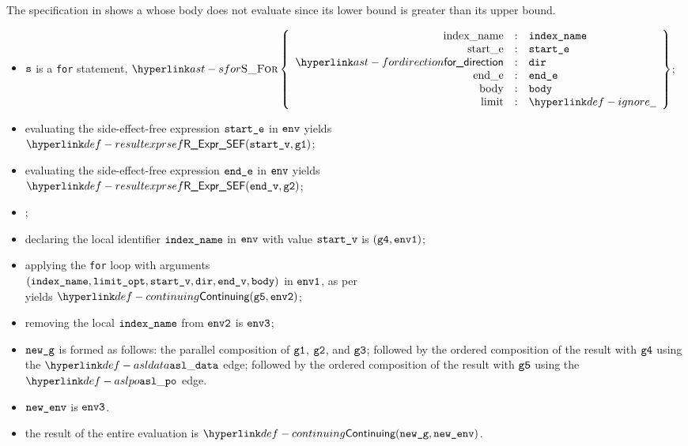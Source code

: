 The specification in  shows a \forstatementterm{}
whose body does not evaluate since its lower bound is greater than its upper bound.

\ProseParagraph
\AllApply
\begin{itemize}
  \item $\texttt{s}$ is a \texttt{for} statement, $\SFor\left\{\begin{array}{rcl}
    \Forindexname &:& \vindexname\\
    \Forstarte &:& \vstarte\\
    \fordirection &:& \vdir\\
    \Forende &:& \vende\\
    \Forbody &:& \vbody\\
    \Forlimit &:& \Ignore
  \end{array}\right\}$;
  \item evaluating the side-effect-free expression $\texttt{start\_e}$ in $\env$ yields\\
        $\ResultExprSEF(\vstartv, \vgone)$\ProseOrDynErrorDiverging;
  \item evaluating the side-effect-free expression $\texttt{end\_e}$ in $\env$ yields\\
        $\ResultExprSEF(\vendv, \vgtwo)$\ProseOrError;
  \item \Proseevallimit{$\env$}{$\velimitopt$}{$(\vlimitopt, \vgthree)$}\ProseOrDynErrorDiverging;
  \item declaring the local identifier $\texttt{index\_name}$ in $\env$ with value $\texttt{start\_v}$ is $(\texttt{g4}, \texttt{env1})$;
  \item applying the \texttt{for} loop with arguments \\
        $(\texttt{index\_name}, \texttt{limit\_opt}, \texttt{start\_v}, \texttt{dir}, \texttt{end\_v}, \texttt{body})$ in $\texttt{env1}$,
        as per \\
         yields $\Continuing(\vgfive, \envtwo)$\ProseReturningOrAbnormal;
  \item removing the local $\texttt{index\_name}$ from $\texttt{env2}$ is $\texttt{env3}$;
  \item $\texttt{new\_g}$ is formed as follows:
        the parallel composition of $\texttt{g1}$, $\texttt{g2}$, and $\texttt{g3}$;
        followed by the ordered composition of the result with $\texttt{g4}$ using the $\asldata$ edge;
        followed by the ordered composition of the result with $\texttt{g5}$ using the $\aslpo$ edge.
  \item $\texttt{new\_env}$ is $\texttt{env3}$.
  \item the result of the entire evaluation is $\Continuing(\newg, \newenv)$.
\end{itemize}

